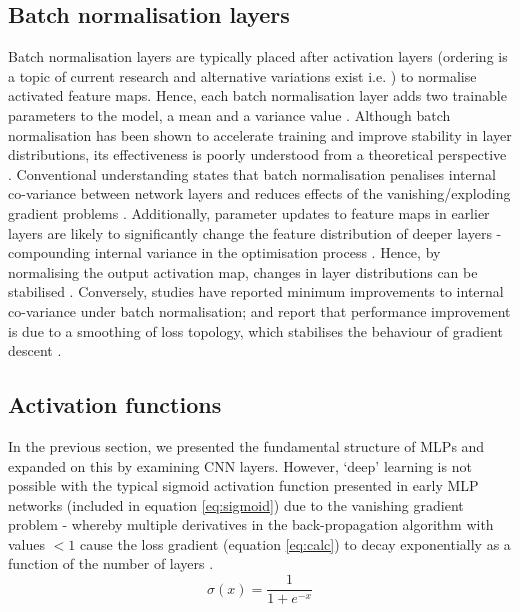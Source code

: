 \subsection{Batch normalisation layers}
Batch normalisation layers are typically placed after activation layers (ordering is a topic of current research and alternative variations exist i.e. \cite{Kazemifar_2018}) to normalise activated feature maps. Hence, each batch normalisation layer adds two trainable parameters to the model, a mean and a variance value \cite{Lundervold2019}. Although batch normalisation has been shown to accelerate training and improve stability in layer distributions, its effectiveness is poorly understood from a theoretical perspective \cite{santurkar2018}. Conventional understanding states that batch normalisation penalises internal co-variance between network layers \cite{ioffe2015} and reduces effects of the vanishing/exploding gradient problems \cite{Li2014}. Additionally, parameter updates to feature maps in earlier layers are likely to significantly change the feature distribution of deeper layers - compounding internal variance in the optimisation process \cite{santurkar2018}. Hence, by normalising the output activation map, changes in layer distributions can be stabilised \cite{santurkar2018}. Conversely, studies have reported minimum improvements to internal co-variance under batch normalisation; and report that performance improvement is due to a smoothing of loss topology, which stabilises the behaviour of gradient descent \cite{santurkar2018}.

\subsection{Activation functions}
\label{sec:act}
In the previous section, we presented the fundamental structure of MLPs and expanded on this by examining CNN layers. However, `deep' learning is not possible with the typical sigmoid activation function presented in early MLP networks \cite{Lundervold2019} (included in equation \ref{eq:sigmoid}) due to the vanishing gradient problem - whereby multiple derivatives in the back-propagation algorithm with values $<1$ cause the loss gradient (equation \ref{eq:calc}) to decay exponentially as a function of the number of layers \cite{Lundervold2019}. 
\begin{equation}
\sigma(x) = \frac{1}{1+e^{-x}}
\label{eq:sigmoid}
\end{equation}

